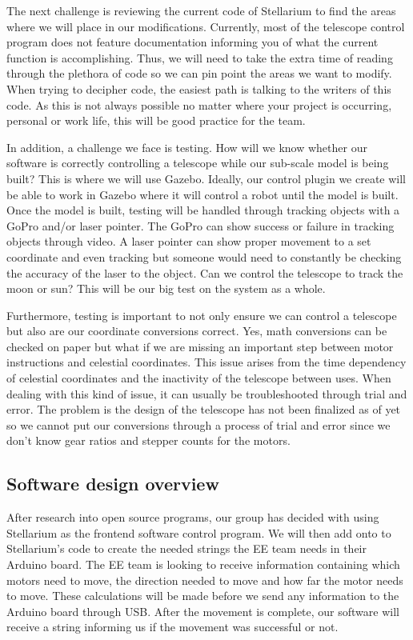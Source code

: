 \documentclass[12pt]{article}
\begin{document}
The next challenge is reviewing the current code of Stellarium to find the areas where we will place in our modifications. Currently, most of the telescope control program does not feature documentation informing you of what the current function is accomplishing. Thus, we will need to take the extra time of reading through the plethora of code so we can pin point the areas we want to modify. When trying to decipher code, the easiest path is talking to the writers of this code. As this is not always possible no matter where your project is occurring, personal or work life, this will be good practice for the team.

In addition, a challenge we face is testing. How will we know whether our software is correctly controlling a telescope while our sub-scale model is being built? This is where we will use Gazebo. Ideally, our control plugin we create will be able to work in Gazebo where it will control a robot until the model is built. Once the model is built, testing will be handled through tracking objects with a GoPro and/or laser pointer. The GoPro can show success or failure in tracking objects through video. A laser pointer can show proper movement to a set coordinate and even tracking but someone would need to constantly be checking the accuracy of the laser to the object. Can we control the telescope to track the moon or sun? This will be our big test on the system as a whole.

Furthermore, testing is important to not only ensure we can control a telescope but also are our coordinate conversions correct. Yes, math conversions can be checked on paper but what if we are missing an important step between motor instructions and celestial coordinates. This issue arises from the time dependency of celestial coordinates and the inactivity of the telescope between uses. When dealing with this kind of issue, it can usually be troubleshooted through trial and error. The problem is the design of the telescope has not been finalized as of yet so we cannot put our conversions through a process of trial and error since we don’t know gear ratios and stepper counts for the motors.


\subsection{Software design overview}

After research into open source programs, our group has decided with using Stellarium as the frontend software control program. We will then add onto to Stellarium’s code to create the needed strings the EE team needs in their Arduino board. The EE team is looking to receive information containing which motors need to move, the direction needed to move and how far the motor needs to move. These calculations will be made before we send any information to the Arduino board through USB. After the movement is complete, our software will receive a string informing us if the movement was successful or not.
\end{document}
